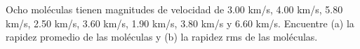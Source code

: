 \item Ocho moléculas tienen magnitudes de velocidad de 3.00 km/s, 4.00 km/s, 5.80 km/s, 2.50 km/s, 3.60 km/s, 1.90 km/s, 3.80 km/s y 6.60 km/s. Encuentre (a) la rapidez promedio de las moléculas y (b) la rapidez rms de las moléculas.
